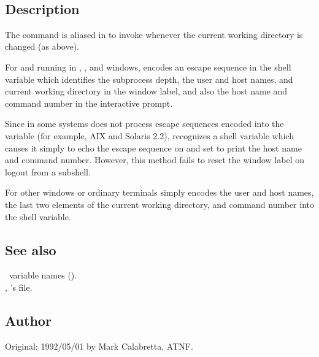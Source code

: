 \begin{synopsis}
   \\
\end{synopsis}

\subsection*{Description}

The  command is aliased in  to invoke
 whenever the current working directory is changed (as above).

For  and  running in ,
, and  windows,  encodes an
escape sequence in the  shell variable which identifies the
subprocess depth, the user and host names, and current working directory in
the window label, and also the host name and command number in the interactive
prompt.

Since  in some systems does not process escape sequences encoded
into the  variable (for example, AIX and Solaris 2.2),
 recognizes a shell variable  which causes
it simply to echo the escape sequence on  and set 
to print the host name and command number.  However, this method fails to
reset the window label on logout from a subshell.

For other windows or ordinary terminals  simply encodes the user
and host names, the last two elements of the current working directory, and
command number into the  shell variable.

\subsection*{See also}

\aipspp\ variable names ().\\
, 's  file.

\subsection*{Author}

Original: 1992/05/01 by Mark Calabretta, ATNF.


